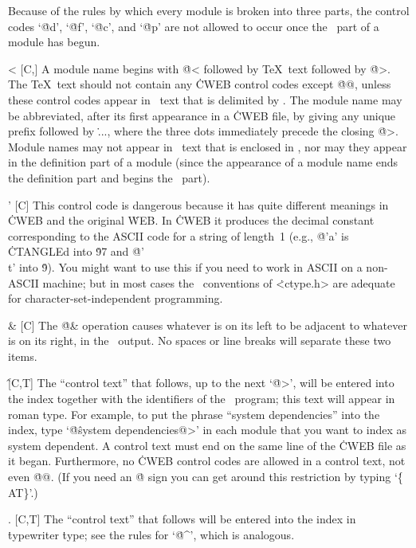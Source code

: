 \more Because of the rules by which every module is broken into three parts,
the control codes `\.{@d}', `\.{@f}', `\.{@c}', and `\.{@p}'
are not allowed to occur once the \Cee\ part of a module has begun.

\@< [C,\oT] A module name begins with \.{@<} followed by \TeX\ text followed
by \.{@>}. The \TeX\ text should not contain any \.{CWEB} control codes
except \.{@@}, unless these control codes appear in \Cee\ text that
is delimited by \pb. The module name may be abbreviated, after its first
appearance in a \.{CWEB} file, by giving any unique prefix followed by \.{...},
where the three dots immediately precede the closing \.{@>}. Module names may
not appear in \Cee\ text that is enclosed in \pb, nor may they appear
in the definition part of a module (since the appearance of a module name
ends the definition part and begins the \Cee\ part).

\@' [C] This control code is dangerous because it has quite different
meanings in \.{CWEB} and the original \.{WEB}. In \.{CWEB} it produces the
decimal constant corresponding to the ASCII code for a string of length~1
(e.g., \.{@'a'} is \.{CTANGLE}d into \.{97} and \.{@'\\t'} into
\.9). You might want to use this if you need to work in ASCII on a
non-ASCII machine; but in most cases the \Cee\ conventions of
\.{<ctype.h>} are adequate for character-set-independent programming.

\@\& [C] The \.{@\&} operation causes whatever is on its left to be
adjacent to whatever is on its right, in the \Cee\ output. No spaces or
line breaks will separate these two items.

\@\^ [C,T] The ``control text'' that follows, up to the next
`\.{@>}', will be entered into the index together with the identifiers of
the \Cee\ program; this text will appear in roman type. For example, to
put the phrase ``system dependencies'' into the index, type
`\.{@\^system dependencies@>}' in each module
that you want to index as system dependent. A control text
must end on the same line of the \.{CWEB} file as it began.  Furthermore,
no \.{CWEB} control codes are allowed in a control text, not even
\.{@@}. (If you need an \.{@} sign you can get around this restriction by
typing `\.{\{\\AT\}}'.)

\@. [C,T] The ``control text'' that follows will be entered into the index
in \.{typewriter} \.{type}; see the rules for `\.{@\^}', which is analogous.

